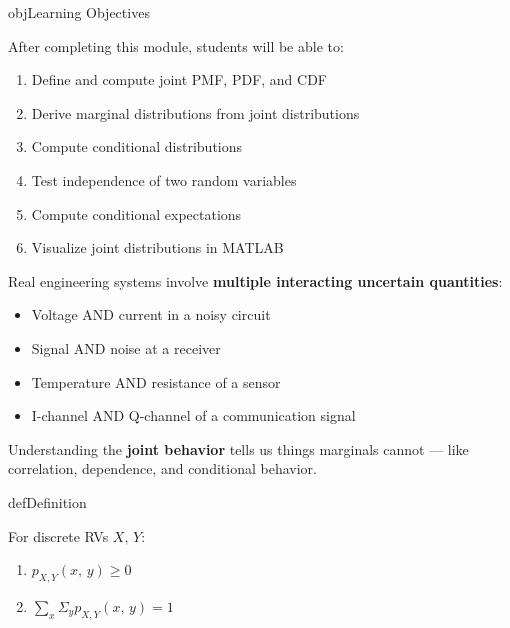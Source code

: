 \begin{PSbox}[unbreakable]{obj}{Learning Objectives}

After completing this module, students will be able to:

\begin{enumerate}
\def\labelenumi{\arabic{enumi}.}
\tightlist
\item
  Define and compute joint PMF, PDF, and CDF
\item
  Derive marginal distributions from joint distributions
\item
  Compute conditional distributions
\item
  Test independence of two random variables
\item
  Compute conditional expectations
\item
  Visualize joint distributions in MATLAB
\end{enumerate}

\end{PSbox}


Real engineering systems involve \textbf{multiple interacting uncertain quantities}:

\begin{itemize}
\tightlist
\item
  Voltage AND current in a noisy circuit
\item
  Signal AND noise at a receiver
\item
  Temperature AND resistance of a sensor
\item
  I-channel AND Q-channel of a communication signal
\end{itemize}

Understanding the \textbf{joint behavior} tells us things marginals cannot — like correlation, dependence, and conditional behavior.


\begin{PSbox}[unbreakable]{def}{Definition}

For discrete RVs $X,\, Y$:

\end{PSbox}


\begin{enumerate}
\def\labelenumi{\arabic{enumi}.}
\tightlist
\item
  $p_{X,Y}(x,\,y) \ge 0$
\item
  $\sum_{x} \Sigma_{y} p_{X,Y}(x,\,y) = 1$
\end{enumerate}

